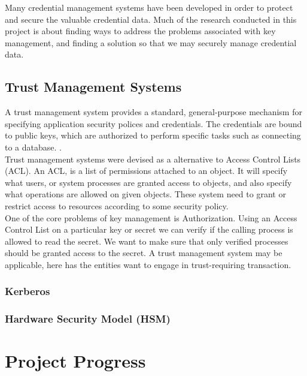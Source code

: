 \documentclass[11pt, a4paper, notitlepage]{article}
\begin{document}
Many credential management systems have been developed in order to protect and secure the valuable credential data. Much of the research conducted in this project is about finding ways to address the problems associated with key management, and finding a solution so that we may securely manage credential data. \\

\subsection*{Trust Management Systems}
A trust management system provides a standard, general-purpose mechanism for specifying application security polices and credentials.
The credentials are bound to public keys, which are authorized to perform specific tasks such as connecting to a database. \cite{blaze1999keynote}. \\

Trust management systems were devised as a alternative to Access Control Lists (ACL). An ACL, is a list of permissions attached to an object. It will specify what users, or system processes are granted access to objects, and also specify what operations are allowed on given objects. \cite{acl-rfc} These system need to grant or restrict access to resources according to some security policy. \\

One of the core problems of key management is Authorization. Using an Access Control List on a particular key or secret we can verify if the calling process is allowed to read the secret. We want to make sure that only verified processes should be granted access to the secret. A trust management system may be applicable, here has the entities want to engage in trust-requiring transaction.\cite{herzberg2000access} \\


\subsubsection*{Kerberos}



\subsubsection*{Hardware Security Model (HSM)}


\section{Project Progress}
\end{document}
